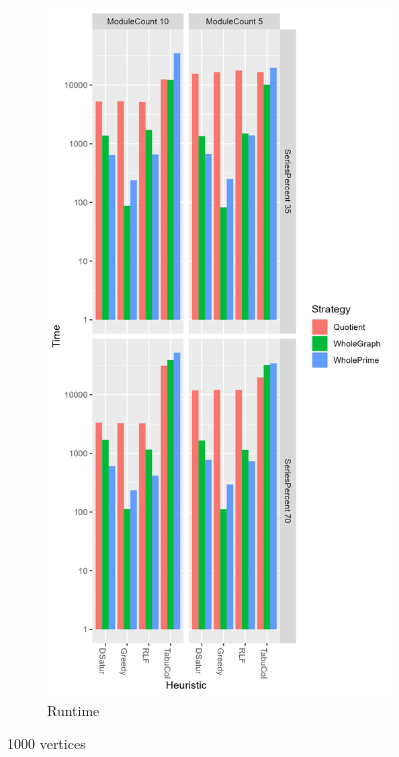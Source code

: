 \documentclass[a4paper]{article}
\begin{document}
\begin{figure}[p]
\begin{subfigure}{.4\paperwidth}
    \end{subfigure}%
    \begin{subfigure}{.4\paperwidth}
        \includegraphics[width=\columnwidth]{Tables/1000Time.png}
      \caption{Runtime}
      \label{fig:1000t}
    \end{subfigure}
\caption{1000 vertices}
\label{fig:1000}
\end{figure}
\end{document}
